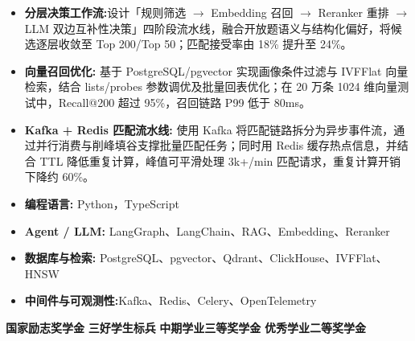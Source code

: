
\begin{itemize}[itemsep=0.5ex, parsep=0ex]
    \item \textbf{分层决策工作流:}设计「规则筛选 $\rightarrow$ Embedding 召回 $\rightarrow$ Reranker 重排 $\rightarrow$ LLM 双边互补性决策」四阶段流水线，融合开放题语义与结构化偏好，将候选逐层收敛至 Top 200/Top 50；匹配接受率由 18\% 提升至 24\%。
    \item \textbf{向量召回优化:} 基于 PostgreSQL/pgvector 实现画像条件过滤与 IVFFlat 向量检索，结合 lists/probes 参数调优及批量回表优化；在 20 万条 1024 维向量测试中，Recall@200 超过 95\%，召回链路 P99 低于 80ms。
    \item \textbf{Kafka + Redis 匹配流水线:} 使用 Kafka 将匹配链路拆分为异步事件流，通过并行消费与削峰填谷支撑批量匹配任务；同时用 Redis 缓存热点信息，并结合 TTL 降低重复计算，峰值可平滑处理 3k+/min 匹配请求，重复计算开销下降约 60\%。
\end{itemize}

\begin{itemize}[parsep=0ex, itemsep=0ex, leftmargin=*]
    \item \textbf{编程语言:} Python，TypeScript  \item \textbf{Agent / LLM:} LangGraph、LangChain、RAG、Embedding、Reranker \item \textbf{数据库与检索:} PostgreSQL、pgvector、Qdrant、ClickHouse、IVFFlat、HNSW \item \textbf{中间件与可观测性:}Kafka、Redis、Celery、OpenTelemetry
\end{itemize}

\textbf{国家励志奖学金}\quad
\textbf{三好学生标兵}\quad
\textbf{中期学业三等奖学金}\quad
\textbf{优秀学业二等奖学金}\par
